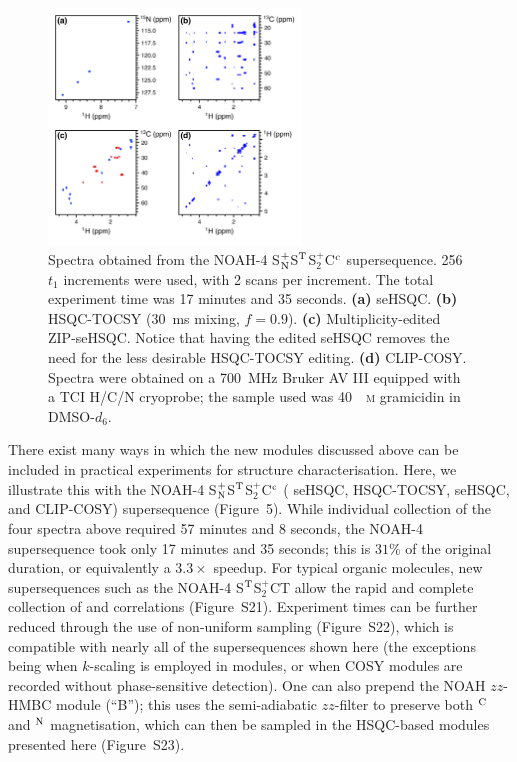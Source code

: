 \documentclass[final,twocolumn]{elsarticle}
\newcommand*{\noahB}{B}
\newcommand*{\noahC}{C}
\newcommand*{\noahCc}{C$\rm ^c$}
\newcommand*{\noahSpb}{S$^+_2$}
\newcommand*{\noahSt}{S$\rm ^T$}
\newcommand*{\noahSpn}{S$\rm ^+_N$}
\newcommand*{\noahT}{T}
\newcommand*{\carbon}{\ce{^{13}C}}
\newcommand*{\nitrogen}{\ce{^{15}N}}
\newcommand*{\magn}[1]{\ce{^1H}$^{#1}$}
\begin{document}
\begin{figure}[!ht]
    \centering
    \includegraphics[width=0.6\textwidth]{FIG5.png}
    \caption{
        Spectra obtained from the NOAH-4 \noahSpn{}\noahSt{}\noahSpb{}\noahCc{} supersequence.
        256 $t_1$ increments were used, with 2 scans per increment.
        The total experiment time was 17 minutes and 35 seconds.
        \textbf{(a)} \nitrogen{} seHSQC.
        \textbf{(b)} \carbon{} HSQC-TOCSY (\SI{30}{ms} mixing, $f = 0.9$).
        \textbf{(c)} Multiplicity-edited \carbon{} ZIP-seHSQC. Notice that having the edited seHSQC removes the need for the less desirable HSQC-TOCSY editing.
        \textbf{(d)} CLIP-COSY.
        Spectra were obtained on a \SI{700}{\MHz} Bruker AV III equipped with a TCI H/C/N cryoprobe; the sample used was \SI{40}{\milli\textsc{m}} gramicidin in DMSO-$d_6$.
    }
    \label{fig:spnstspcc}
\end{figure}

There exist many ways in which the new modules discussed above can be included in practical experiments for structure characterisation.
Here, we illustrate this with the NOAH-4 \noahSpn{}\noahSt{}\noahSpb{}\noahCc{} (\nitrogen{} seHSQC, \carbon{} HSQC-TOCSY, \carbon{} seHSQC, and CLIP-COSY) supersequence (Figure~5).
While individual collection of the four spectra above required 57 minutes and 8 seconds, the NOAH-4 supersequence took only 17 minutes and 35 seconds; this is $31\%$ of the original duration, or equivalently a $3.3\times$ speedup.
For typical organic molecules, new supersequences such as the NOAH-4 \noahSt{}\noahSpb{}\noahC{}\noahT{} allow the rapid and complete collection of  and  correlations (Figure~S21).
Experiment times can be further reduced through the use of non-uniform sampling\cite{Kazimierczuk2010PNMRS, Mobli2014PNMRS, Kazimierczuk2015MRC, Golowicz2020PNMRS} (Figure~S22), which is compatible with nearly all of the supersequences shown here (the exceptions being when $k$-scaling is employed in \nitrogen{} modules, or when COSY modules are recorded without phase-sensitive detection).
One can also prepend the NOAH $zz$-HMBC module (``\noahB{}'');\cite{Kupce2018CC, Kupce2019JMR} this uses the semi-adiabatic $zz$-filter to preserve both \magn{\ce{C}} and \magn{\ce{N}} magnetisation, which can then be sampled in the HSQC-based modules presented here (Figure~S23).
\end{document}
